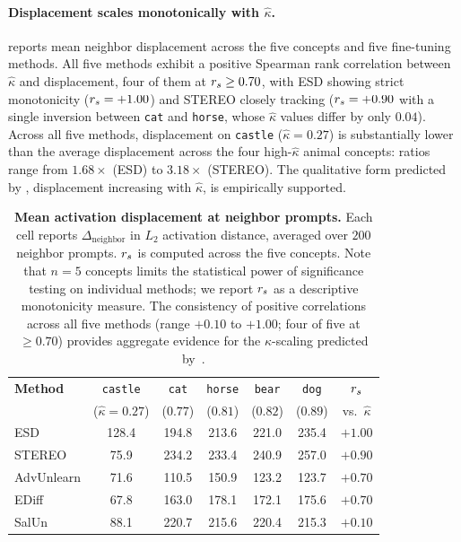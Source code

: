 \paragraph{Displacement scales monotonically with $\hat\kappa$.}
 reports mean neighbor displacement across the five concepts and five fine-tuning methods. All five methods exhibit a positive Spearman rank correlation between $\hat\kappa$ and displacement, four of them at $r_s\geq0.70$, with ESD showing strict monotonicity ($r_s = +1.00$) and STEREO closely tracking ($r_s = +0.90$ with a single inversion between \texttt{cat} and \texttt{horse}, whose $\hat\kappa$ values differ by only $0.04$). Across all five methods, displacement on \texttt{castle} ($\hat\kappa = 0.27$) is substantially lower than the average displacement across the four high-$\hat\kappa$ animal concepts: ratios range from $1.68\times$ (ESD) to $3.18\times$ (STEREO). The qualitative form predicted by , displacement increasing with $\hat\kappa$, is empirically supported.

\begin{table}[h]
\centering
\small
\setlength{\tabcolsep}{6pt}
\begin{tabular}{lccccc|c}
\toprule
\textbf{Method} & \texttt{castle} & \texttt{cat} & \texttt{horse} & \texttt{bear} & \texttt{dog} & $r_s$ \\
& ($\hat\kappa{=}0.27$) & ($0.77$) & ($0.81$) & ($0.82$) & ($0.89$) & vs.\ $\hat\kappa$ \\
\midrule
ESD        & 128.4 & 194.8 & 213.6 & 221.0 & 235.4 & $+1.00$ \\
STEREO     & \phantom{0}75.9 & 234.2 & 233.4 & 240.9 & 257.0 & $+0.90$ \\
AdvUnlearn & \phantom{0}71.6 & 110.5 & 150.9 & 123.2 & 123.7 & $+0.70$ \\
EDiff      & \phantom{0}67.8 & 163.0 & 178.1 & 172.1 & 175.6 & $+0.70$ \\
SalUn      & \phantom{0}88.1 & 220.7 & 215.6 & 220.4 & 215.3 & $+0.10$ \\
\bottomrule
\end{tabular}
\caption{\textbf{Mean activation displacement at neighbor prompts.} Each cell reports $\Delta_{\text{neighbor}}$ in $L_2$ activation distance, averaged over $200$ neighbor prompts. $r_s$ is computed across the five concepts. Note that $n = 5$ concepts limits the statistical power of significance testing on individual methods; we report $r_s$ as a descriptive monotonicity measure. The consistency of positive correlations across all five methods (range $+0.10$ to $+1.00$; four of five at $\geq 0.70$) provides aggregate evidence for the $\kappa$-scaling predicted by~.}
\label{tab:displacement}
\end{table}

